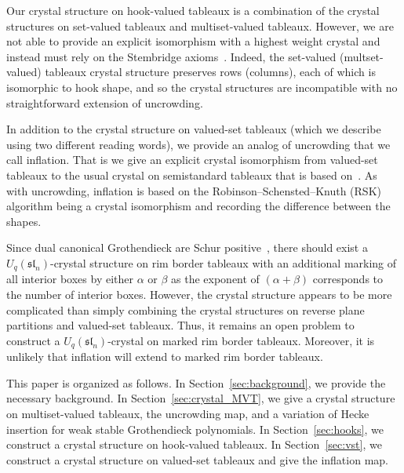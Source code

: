 \documentclass[ALCO,ThmDefs,Unicode,epreuves]{cedram}
\newcommand{\fsl}{\mathfrak{sl}}
\begin{document}
Our crystal structure on hook-valued tableaux is a combination of the crystal structures on set-valued tableaux and multiset-valued tableaux. However, we are not able to provide an explicit isomorphism with a highest weight crystal and instead must rely on the Stembridge axioms~\cite{Stembridge03}. Indeed, the set-valued (\resp multset-valued) tableaux crystal structure preserves rows (\resp columns), each of which is isomorphic to hook shape, and so the crystal structures are incompatible with no straightforward extension of uncrowding.

In addition to the crystal structure on valued-set tableaux (which we describe using two different reading words), we provide an analog of uncrowding that we call inflation. That is we give an explicit crystal isomorphism from valued-set tableaux to the usual crystal on semistandard tableaux that is based on~\cite[Thm.~9.8]{LamPyl07}. As with uncrowding, inflation is based on the Robinson--Schensted--Knuth (RSK) algorithm being a crystal isomorphism and recording the difference between the shapes.

Since dual canonical Grothendieck are Schur positive~\cite[Thm.~9.8]{Yel17}, there should exist a $U_q(\fsl_n)$-crystal structure on rim border tableaux with an additional marking of all interior boxes by either $\alpha$ or $\beta$ as the exponent of $(\alpha + \beta)$ corresponds to the number of interior boxes. However, the crystal structure appears to be more complicated than simply combining the crystal structures on reverse plane partitions and valued-set tableaux. Thus, it remains an open problem to construct a $U_q(\fsl_n)$-crystal on marked rim border tableaux. Moreover, it is unlikely that inflation will extend to marked rim border tableaux.

This paper is organized as follows.
In Section~\ref{sec:background}, we provide the necessary background.
In Section~\ref{sec:crystal_MVT}, we give a crystal structure on multiset-valued tableaux, the uncrowding map, and a variation of Hecke insertion for weak stable Grothendieck polynomials.
In Section~\ref{sec:hooks}, we construct a crystal structure on hook-valued tableaux.
In Section~\ref{sec:vst}, we construct a crystal structure on valued-set tableaux and give the inflation map.



\end{document}
